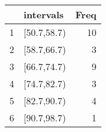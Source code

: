 \begin{table}[ht]
\centering
\begin{tabular}{rlr}
  \hline
 & intervals & Freq \\ 
  \hline
1 & [50.7,58.7) &  10 \\ 
  2 & [58.7,66.7) &   3 \\ 
  3 & [66.7,74.7) &   9 \\ 
  4 & [74.7,82.7) &   3 \\ 
  5 & [82.7,90.7) &   4 \\ 
  6 & [90.7,98.7) &   1 \\ 
   \hline
\end{tabular}
\end{table}
